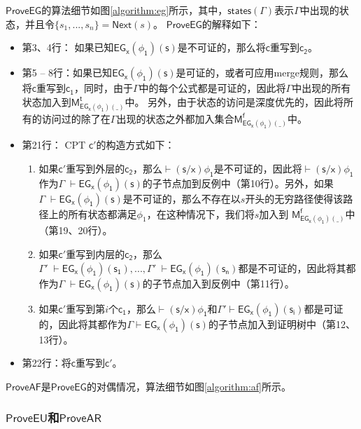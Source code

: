 $\mathsf{ProveEG}$的算法细节如图\ref{algorithm:eg}所示，其中，$\mathsf{states(\Gamma)}$表示$\mathsf{\Gamma}$中出现的状态，并且令$\{s_1,...,s_n\}=\textsf{Next}(s)$。
$\mathsf{ProveEG}$的解释如下：
\begin{itemize}
	\item 第3、4行： 如果已知$\mathsf{EG_x(\phi_1)(s)}$是不可证的，那么将$\mathsf{c}$重写到$\mathsf{c_2}$。
	\item 第5 -- 8行：如果已知$\mathsf{EG_x(\phi_1)(s)}$是可证的，或者可应用merge规则，那么将$\mathsf{c}$重写到$\mathsf{c_1}$，同时，由于$\mathsf{\Gamma}$中的每个公式都是可证的，因此将$\mathsf{\Gamma}$中出现的所有状态加入到$\mathsf{M_{EG_x(\phi_1)(\_)}^t}$中。
	另外，由于状态的访问是深度优先的，因此将所有的访问过的除了在$\mathsf{\Gamma}$出现的状态之外都加入集合$\mathsf{M_{EG_x(\phi_1)(\_)}^f}$中。
	\item 第21行： \textsf{CPT} $\mathsf{c'}$的构造方式如下：
	\begin{enumerate}
		\item 如果$\mathsf{c'}$重写到外层的$\mathsf{c_2}$，那么$\mathsf{\vdash(s/x)\phi_1}$是不可证的，因此将$\mathsf{\vdash(s/x)\phi_1}$作为$\Gamma\;\mathsf{\vdash EG_x(\phi_1)(s)}$的子节点加到反例中（第10行）。另外，如果$\Gamma\;\mathsf{\vdash EG_x(\phi_1)(s)}$是不可证的，那么不存在以$s$开头的无穷路径使得该路径上的所有状态都满足$\phi_1$，在这种情况下，我们将$s$加入到 $\mathsf{M_{EG_x(\phi_1)(\_)}^f}$中（第19、20行）。
		
		\item 如果$\mathsf{c'}$重写到内层的$\mathsf{c_2}$，那么$\Gamma'\;\mathsf{\vdash EG_x(\phi_1)(s_1)}, ... , \Gamma'\;\mathsf{\vdash EG_x(\phi_1)(s_n)}$都是不可证的，因此将其都作为$\Gamma\;\mathsf{\vdash EG_x(\phi_1)(s)}$的子节点加入到反例中（第11行）。
		\item 如果$\mathsf{c'}$重写到第$i$个$\mathsf{c_1}$，那么$\mathsf{\vdash(s/x)\phi_1}$和$\mathsf{\Gamma'\vdash EG_x(\phi_1)(s_i)}$都是可证的，因此将其都作为$\mathsf{\Gamma\vdash EG_x(\phi_1)(s)}$的子节点加入到证明树中（第12、13行）。 
	\end{enumerate}
	\item 第22行：将$\mathsf{c}$重写到$\mathsf{c'}$。
\end{itemize}


$\mathsf{ProveAF}$是$\mathsf{ProveEG}$的对偶情况，算法细节如图\ref{algorithm:af}所示。


\subsubsection{$\mathsf{ProveEU}$和$\mathsf{ProveAR}$}

